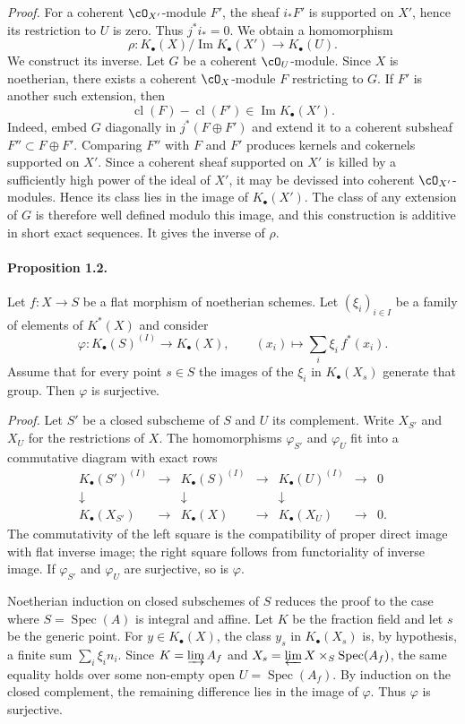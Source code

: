 \documentclass[11pt]{article}
\theoremstyle{plain}
\theoremstyle{definition}
\theoremstyle{remark}
\DeclareMathOperator{\Spec}{Spec}
\DeclareMathOperator{\Imop}{Im}
\DeclareMathOperator{\cl}{cl}
\newcommand{\longto}{\longrightarrow}
\begin{document}
\emph{Proof.}
For a coherent $\cO_{X'}$-module $F'$, the sheaf $i_*F'$ is supported on $X'$, hence its restriction to $U$ is zero. Thus $j^*i_*=0$. We obtain a homomorphism
\[
\rho:K_\bullet(X)/\Imop K_\bullet(X')\longto K_\bullet(U).
\]
We construct its inverse. Let $G$ be a coherent $\cO_U$-module. Since $X$ is noetherian, there exists a coherent $\cO_X$-module $F$ restricting to $G$. If $F'$ is another such extension, then
\[
\cl(F)-\cl(F')\in\Imop K_\bullet(X').
\]
Indeed, embed $G$ diagonally in $j^*(F\oplus F')$ and extend it to a coherent subsheaf $F''\subset F\oplus F'$. Comparing $F''$ with $F$ and $F'$ produces kernels and cokernels supported on $X'$. Since a coherent sheaf supported on $X'$ is killed by a sufficiently high power of the ideal of $X'$, it may be devissed into coherent $\cO_{X'}$-modules. Hence its class lies in the image of $K_\bullet(X')$. The class of any extension of $G$ is therefore well defined modulo this image, and this construction is additive in short exact sequences. It gives the inverse of $\rho$.

\paragraph{Proposition 1.2.}
Let $f:X\to S$ be a flat morphism of noetherian schemes. Let $(\xi_i)_{i\in I}$ be a family of elements of $K^*(X)$ and consider
\[
\varphi:K_\bullet(S)^{(I)}\longto K_\bullet(X),\qquad
(x_i)\longmapsto \sum_i \xi_i\,f^*(x_i).
\]
Assume that for every point $s\in S$ the images of the $\xi_i$ in $K_\bullet(X_s)$ generate that group. Then $\varphi$ is surjective.

\emph{Proof.}
Let $S'$ be a closed subscheme of $S$ and $U$ its complement. Write $X_{S'}$ and $X_U$ for the restrictions of $X$. The homomorphisms $\varphi_{S'}$ and $\varphi_U$ fit into a commutative diagram with exact rows
\[
\begin{array}{ccccccccc}
K_\bullet(S')^{(I)}&\to&K_\bullet(S)^{(I)}&\to&K_\bullet(U)^{(I)}&\to&0\\
\downarrow&&\downarrow&&\downarrow&&\\
K_\bullet(X_{S'})&\to&K_\bullet(X)&\to&K_\bullet(X_U)&\to&0.
\end{array}
\]
The commutativity of the left square is the compatibility of proper direct image with flat inverse image; the right square follows from functoriality of inverse image. If $\varphi_{S'}$ and $\varphi_U$ are surjective, so is $\varphi$.

Noetherian induction on closed subschemes of $S$ reduces the proof to the case where $S=\Spec(A)$ is integral and affine. Let $K$ be the fraction field and let $s$ be the generic point. For $y\in K_\bullet(X)$, the class $y_s$ in $K_\bullet(X_s)$ is, by hypothesis, a finite sum $\sum_i \xi_i n_i$. Since $K=\varinjlim A_f$ and $X_s=\varprojlim X\times_S\Spec(A_f)$, the same equality holds over some non-empty open $U=\Spec(A_f)$. By induction on the closed complement, the remaining difference lies in the image of $\varphi$. Thus $\varphi$ is surjective.
\end{document}
